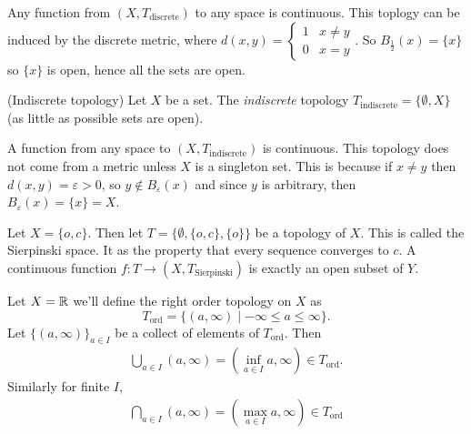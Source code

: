 \documentclass{article}
\begin{document}
\begin{remark}
	Any function from $ (X,T_{\text{discrete}}) $ to any space is continuous. This toplogy can be induced by the discrete metric, where $ d(x,y) = \begin{cases}
		1 & x\ne y \\
		0 & x = y
	\end{cases} $. So $ B_{\frac 12}(x) = \{x\} $ so $ \{x\} $ is open, hence all the sets are open. 
\end{remark}
\begin{definition}
	(Indiscrete topology) Let $ X $ be a set. The \textit{indiscrete} topology $ T_{\text{indiscrete}} = \{\emptyset, X\} $ (as little as possible sets are open).
\end{definition}
\begin{remark}
	A function from any space to $ (X,T_{\text{indiscrete}}) $ is continuous. This topology does not come from a metric unless $ X $ is a singleton set. This is because if $ x\ne y $ then $ d(x,y)=\varepsilon > 0 $, so $ y\notin B_\varepsilon(x) $ and since $ y $ is arbitrary, then $ B_\varepsilon(x) = \{x\}=X $.
\end{remark}
Let $ X = \{o,c\} $. Then let $ T = \{ \emptyset, \{o,c\}, \{o\}\} $ be a topology of $ X $. This is called the Sierpinski space. It as the property that every sequence converges to $ c $. A continuous function $ f:T\to (X,T_{\text{Sierpinski}}) $ is exactly an open subset of $ Y $.\par
Let $ X = \mathbb{R} $ we'll define the right order topology on $ X $ as
\[
	T_{\text{ord}} = \{(a,\infty) \mid -\infty \le a \le \infty\}.
\]
Let $ \{(a,\infty)\}_{a\in I} $ be a collect of elements of $ T_{\text{ord}} $. Then
\begin{align*}
	\bigcup_{a\in I} (a,\infty) = (\inf_{a\in I}a,\infty)\in T_{\text{ord}}.
\end{align*}
Similarly for finite $ I $,
\begin{align*}
	\bigcap_{a\in I}(a,\infty) = (\max_{a\in I}a,\infty) \in T_{\text{ord}}
\end{align*}
\end{document}
